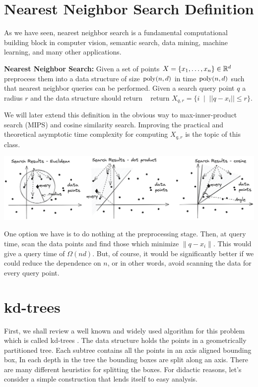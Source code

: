 \documentclass{article}
\begin{document}
\section{Nearest Neighbor Search Definition}

As we have seen, nearest neighbor search is a fundamental computational building block in computer vision, semantic search, data mining, machine learning, and many other applications.

\begin{definition}{\bf Nearest Neighbor Search:} Given a set of points $X = \{x_1,\ldots,x_n\} \in {\mathbb{R}}^{d}$ 
preprocess them into a data structure of size ${\operatorname{poly}}(n,d)$ in time ${\operatorname{poly}}(n,d)$ such that nearest neighbor queries can
be performed. Given a search query point $q$ a radius $r$ and the data structure should return  
return $X_{q,r} = \{i \;\; | \;\; ||q - x_i || \le r \}$. 
\end{definition}
We will later extend this definition in the obvious way to max-inner-product search (MIPS) and cosine similarity search.
Improving the practical and theoretical asymptotic time complexity for computing $X_{q,r}$ is the topic of this class.

\begin{center}
\includegraphics[width=1.0\textwidth]{images/vectorsearch.png}
\end{center}

One option we have is to do nothing at the preprocessing stage. Then, at query time, scan the data points and find those which minimize $\|q - x_i\|$.
This would give a query time of $\Omega(nd)$. But, of course, it would be significantly better if we could reduce the dependence on $n$, or in other words, avoid scanning the data for every query point.

\section{kd-trees}
First, we shall review a well known and widely used algorithm for this problem which is called kd-trees \cite{Bentley75}.
The data structure holds the points in a geometrically partitioned tree. 
Each subtree contains all the points in an axis aligned bounding box,
In each depth in the tree the bounding boxes are split along an axis.
There are many different heuristics for splitting the boxes. For didactic reasons, let's consider a simple construction that lends itself to easy analysis.
\end{document}
